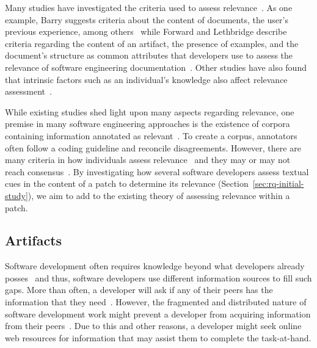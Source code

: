 

Many studies have investigated the criteria used to assess relevance~\cite{Barry1994, Freund2015, Forward2002}. 
As one example,
Barry suggests criteria about the content of documents, the user's
previous experience, among others~\cite{Barry1994} while 
Forward and Lethbridge describe criteria regarding the 
content of an artifact, the presence of examples, and the document's structure as
 common attributes that developers use to assess the relevance of software engineering documentation~\cite{Forward2002}.
Other studies have also found that intrinsic factors such as an individual's knowledge 
also affect relevance assessment~\cite{Freund2015, Ingwersen1996}.



While existing studies shed light upon many aspects regarding relevance,
one premise
in many software engineering approaches is the existence of corpora containing information
annotated as relevant~\cite{Jiang2016b, Robillard2015}.  
To create a
corpus, annotators often follow a coding guideline and reconcile disagreements.  However, there are many criteria in how individuals
assess relevance~\cite{Barry1994, Barry1998, Freund2015} and they may
or may not reach consensus~\cite{Saracevic2007c}.
By investigating how several software developers assess textual cues in the content of a patch to determine its relevance (Section~\ref{sec:rq-initial-study}),
we aim to add to the existing theory of assessing relevance within a patch.



\subsection{Artifacts}



Software development often requires knowledge beyond what developers already posses~\cite{Li2013}
and thus, software developers use different information sources to fill such gaps. 
More than often, a developer will ask if any of their peers has the information that they need~\cite{singer2011}. 
However, the fragmented and distributed nature of software development work 
might prevent a developer from acquiring information from their peers~\cite{ko2007}.
Due to this and other reasons, a developer might seek
online web resources for information 
that may assist them to complete the task-at-hand.




